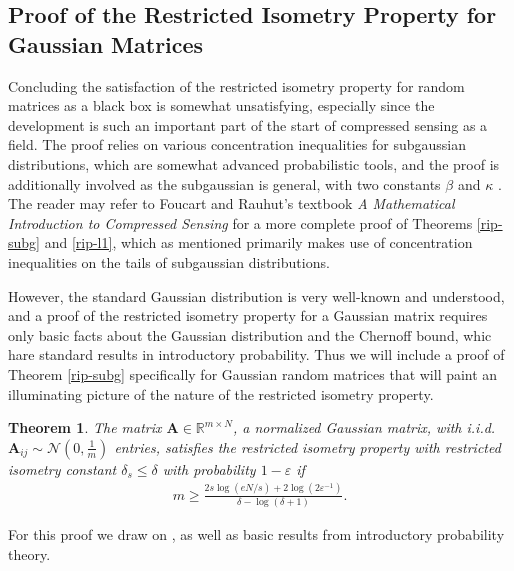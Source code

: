 \documentclass[12pt,a4paper]{amsart}
\numberwithin{equation}{section}
\theoremstyle{plain}
\newtheorem{Th}{Theorem}[section]
\theoremstyle{definition}
\newcommand{\BR}{\mathbb R}
\newcommand{\bdA}{\mathbf{A}}
\begin{document}
\subsection{Proof of the Restricted Isometry Property for Gaussian Matrices}\label{gaussian-pf} Concluding the satisfaction of the restricted isometry property for random matrices as a black box is somewhat unsatisfying, especially since the development is such an important part of the start of compressed sensing as a field. The proof relies on various concentration inequalities for subgaussian distributions, which are somewhat advanced probabilistic tools, and the proof is additionally involved as the subgaussian is general, with two constants $\beta$ and $\kappa$ \cite{fou-rau}. The reader may refer to Foucart and Rauhut's textbook \textit{A Mathematical Introduction to Compressed Sensing} \cite{fou-rau} for a more complete proof of Theorems \ref{rip-subg} and \ref{rip-l1}, which as mentioned primarily makes use of concentration inequalities on the tails of subgaussian distributions.

However, the standard Gaussian distribution is very well-known and understood, and a proof of the restricted isometry property for a Gaussian matrix requires only basic facts about the Gaussian distribution and the Chernoff bound, whic hare standard results in introductory probability. Thus we will include a proof of Theorem \ref{rip-subg} specifically for Gaussian random matrices that will paint an illuminating picture of the nature of the restricted isometry property.

\begin{Th}\label{rip-gaussian} The matrix $\bdA\in\BR^{m\times N}$, a normalized Gaussian matrix, with i.i.d. $\bdA_{ij}\sim\mathcal{N}(0,\frac{1}{m})$ entries, satisfies the restricted isometry property with restricted isometry constant $\delta_s\leq\delta$ with probability $1-\varepsilon$ if
\begin{align}\label{rip-gaussian-m}
    m\geq\frac{2s\log(eN/s)+2\log(2\varepsilon^{-1})}{\delta-\log(\delta+1)}.
\end{align}

\end{Th}

For this proof we draw on \cite{fou-rau, park-lee}, as well as basic results from introductory probability theory.
\end{document}

